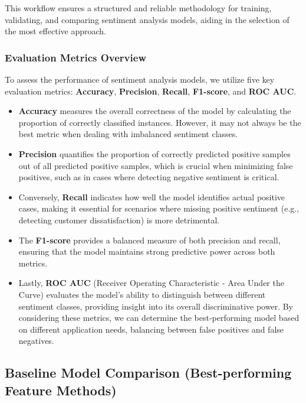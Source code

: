 This workflow ensures a structured and reliable methodology for training, validating, and comparing sentiment analysis models, aiding in the selection of the most effective approach.

\subsubsection{Evaluation Metrics Overview}

To assess the performance of sentiment analysis models, we utilize five key evaluation metrics: \textbf{Accuracy}, \textbf{Precision}, \textbf{Recall}, \textbf{F1-score}, and \textbf{ROC AUC}. 

\begin{itemize}
    \item \textbf{Accuracy} measures the overall correctness of the model by calculating the proportion of correctly classified instances. However, it may not always be the best metric when dealing with imbalanced sentiment classes. 
    
    \item \textbf{Precision} quantifies the proportion of correctly predicted positive samples out of all predicted positive samples, which is crucial when minimizing false positives, such as in cases where detecting negative sentiment is critical. 
    
    \item Conversely, \textbf{Recall} indicates how well the model identifies actual positive cases, making it essential for scenarios where missing positive sentiment (e.g., detecting customer dissatisfaction) is more detrimental.  
    
    \item The \textbf{F1-score} provides a balanced measure of both precision and recall, ensuring that the model maintains strong predictive power across both metrics. 
    
    \item Lastly, \textbf{ROC AUC} (Receiver Operating Characteristic - Area Under the Curve) evaluates the model's ability to distinguish between different sentiment classes, providing insight into its overall discriminative power. By considering these metrics, we can determine the best-performing model based on different application needs, balancing between false positives and false negatives.
\end{itemize}

\subsection{Baseline Model Comparison (Best-performing Feature Methods)}

